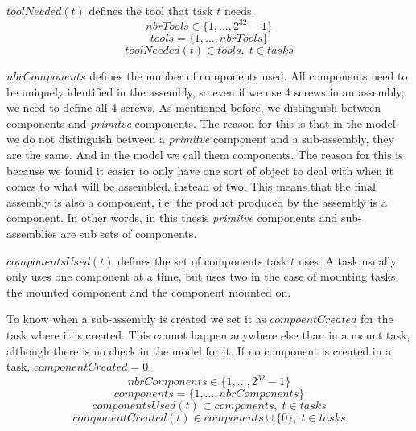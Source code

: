 $toolNeeded(t)$ defines the tool that task $t$ needs.
 \begin{equation}\label{eq:3}
 nbrTools \in \{1 , \ldots , 2^{32}-1\}
 \end{equation}
 \begin{equation}\label{eq:12}
 tools = \{1 , \ldots , nbrTools\}
 \end{equation}
 \begin{equation}\label{eq:33}
 toolNeeded(t) \in tools, \; t \in tasks
 \end{equation} 

  \noindent $nbrComponents$ defines the number of components used. All components need to be uniquely identified in the assembly, so even if we use 4 screws in an assembly, we need to define all 4 screws. As mentioned before, we distinguish between components and \emph{primitve} components. The reason for this is that in the model we do not distinguish between a \emph{primitve} component and a sub-assembly, they are the same. And in the model we call them components. The reason for this is because we found it easier to only have one sort of object to deal with when it comes to what will be assembled, instead of two. This means that the final assembly is also a component, i.e. the product produced by the assembly is a component. In other words, in this thesis \emph{primitve} components and sub-assemblies are sub sets of components.
  
  $componentsUsed(t)$ defines the set of components task $t$ uses. A task usually only uses one component at a time, but uses two in the case of mounting tasks, the mounted component and the component mounted on.
  
  To know when a sub-assembly is created we set it as $compoentCreated$ for the task where it is created. This cannot happen anywhere else than in a mount task, although there is no check in the model for it. If no component is created in a task, $componentCreated=0$.
 \begin{equation}\label{eq:6}
 nbrComponents \in \{1 , \ldots , 2^{32}-1\}
 \end{equation}
 \begin{equation}\label{eq:13}
 components = \{1 , \ldots , nbrComponents\}
 \end{equation}
 \begin{equation}\label{eq:25}
 componentsUsed(t) \subset components, \; t \in tasks
 \end{equation}
 \begin{equation}\label{eq:componentCreated}
 componentCreated(t) \in components \cup \{0\}, \; t \in tasks
 \end{equation}

